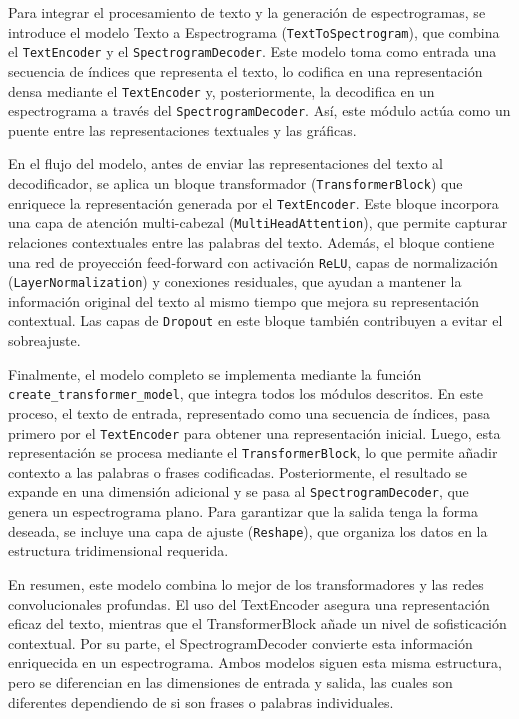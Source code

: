\documentclass{article}
\begin{document}
\begin{Large}
Para integrar el procesamiento de texto y la generación de espectrogramas, se introduce el modelo Texto a Espectrograma (\texttt{TextToSpectrogram}), que combina el \texttt{TextEncoder} y el \texttt{SpectrogramDecoder}. Este modelo toma como entrada una secuencia de índices que representa el texto, lo codifica en una representación densa mediante el \texttt{TextEncoder} y, posteriormente, la decodifica en un espectrograma a través del \texttt{SpectrogramDecoder}. Así, este módulo actúa como un puente entre las representaciones textuales y las gráficas.

En el flujo del modelo, antes de enviar las representaciones del texto al decodificador, se aplica un bloque transformador (\texttt{TransformerBlock}) que enriquece la representación generada por el \texttt{TextEncoder}. Este bloque incorpora una capa de atención multi-cabezal (\texttt{MultiHeadAttention}), que permite capturar relaciones contextuales entre las palabras del texto. Además, el bloque contiene una red de proyección feed-forward con activación \texttt{ReLU}, capas de normalización (\texttt{LayerNormalization}) y conexiones residuales, que ayudan a mantener la información original del texto al mismo tiempo que mejora su representación contextual. Las capas de \texttt{Dropout} en este bloque también contribuyen a evitar el sobreajuste.

Finalmente, el modelo completo se implementa mediante la función \texttt{create\_transformer\_model}, que integra todos los módulos descritos. En este proceso, el texto de entrada, representado como una secuencia de índices, pasa primero por el \texttt{TextEncoder} para obtener una representación inicial. Luego, esta representación se procesa mediante el \texttt{TransformerBlock}, lo que permite añadir contexto a las palabras o frases codificadas. Posteriormente, el resultado se expande en una dimensión adicional y se pasa al \texttt{SpectrogramDecoder}, que genera un espectrograma plano. Para garantizar que la salida tenga la forma deseada, se incluye una capa de ajuste (\texttt{Reshape}), que organiza los datos en la estructura tridimensional requerida.


En resumen, este modelo combina lo mejor de los transformadores y las redes convolucionales profundas. El uso del TextEncoder asegura una representación eficaz del texto, mientras que el TransformerBlock añade un nivel de sofisticación contextual. Por su parte, el SpectrogramDecoder convierte esta información enriquecida en un espectrograma. Ambos modelos siguen esta misma estructura, pero se diferencian en las dimensiones de entrada y salida, las cuales son diferentes dependiendo de si son frases o palabras individuales.


\end{Large}
\end{document}
